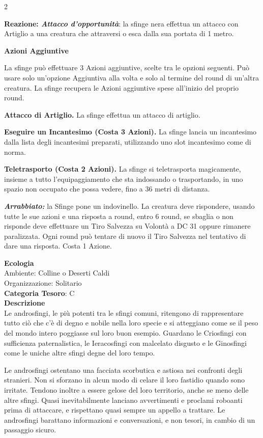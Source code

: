 \begin{multicols}{2}
{\textbf{Reazione: \emph{Attacco d'opportunità}}: la sfinge nera effettua un attacco con Artiglio a una creatura che attraversi o esca dalla sua portata di 1 metro.

\textbf{Azioni Aggiuntive}

La sfinge può effettuare 3 Azioni aggiuntive, scelte tra le opzioni seguenti. Può usare solo un'opzione Aggiuntiva alla volta e solo al termine del round di un'altra creatura. La sfinge recupera le Azioni aggiuntive spese all'inizio del proprio round.

\textbf{Attacco di Artiglio.} La sfinge effettua un attacco di artiglio.

\textbf{Eseguire un Incantesimo (Costa 3 Azioni).} La sfinge lancia un incantesimo dalla lista degli incantesimi preparati, utilizzando uno slot incantesimo come di norma.

\textbf{Teletrasporto (Costa 2 Azioni).} La sfinge si teletrasporta magicamente, insieme a tutto l'equipaggiamento che sta indossando o trasportando, in uno spazio non occupato che possa vedere, fino a 36 metri di distanza.

\emph{\textbf{Arrabbiato:}} la Sfinge pone un indovinello. La creatura deve rispondere, usando tutte le sue azioni e una risposta a round, entro 6 round, se sbaglia o non risponde deve effettuare un Tiro Salvezza su Volontà a DC 31 oppure rimanere paralizzata. Ogni round può tentare di nuovo il Tiro Salvezza nel tentativo di dare una risposta. Costa 1 Azione.

\textbf{Ecologia}\\
Ambiente: Colline o Deserti Caldi\\
Organizzazione: Solitario\\
\textbf{Categoria Tesoro}: C\\
\textbf{Descrizione}\\
Le androsfingi, le più potenti tra le sfingi comuni, ritengono di rappresentare tutto ciò che c'è di degno e nobile nella loro specie e si atteggiano come se il peso del mondo intero poggiasse sul loro buon esempio. Guardano le Criosfingi con sufficienza paternalistica, le Ieracosfingi con malcelato disgusto e le Ginosfingi come le uniche altre sfingi degne del loro tempo.

Le androsfingi ostentano una facciata scorbutica e astiosa nei confronti degli stranieri. Non si sforzano in alcun modo di celare il loro fastidio quando sono irritate. Tendono inoltre a essere gelose del loro territorio, anche se meno delle altre sfingi. Quasi inevitabilmente lanciano avvertimenti e proclami roboanti prima di attaccare, e rispettano quasi sempre un appello a trattare. Le androsfingi barattano informazioni e conversazioni, e non tesori, in cambio di un passaggio sicuro.

}
\end{multicols}
